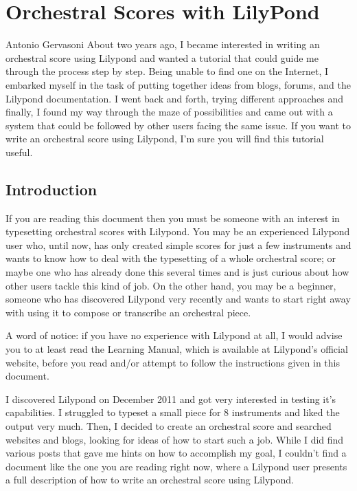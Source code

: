 \documentclass[../../LilyPond-Tutorials]{subfiles}
\begin{document}
\chapter{Orchestral Scores with LilyPond}

\begin{authorAbstract}{Antonio Gervasoni}
About two years ago, I became interested in writing an orchestral score using Lilypond and wanted a tutorial that could guide me through the process step by step. 
Being unable to find one on the Internet, I embarked myself in the task of putting together ideas from blogs, forums, and the Lilypond documentation.
I went back and forth, trying different approaches and finally, I found my way through the maze of possibilities and came out with a system that could be followed by other users facing the same issue.
If you want to write an orchestral score using Lilypond, I'm sure you will find this tutorial useful.
\end{authorAbstract}

\section{Introduction}

If you are reading this document then you must be someone with an interest in typesetting orchestral scores with Lilypond.
You may be an experienced Lilypond user who, until now, has only created simple scores for just a few instruments and wants to know how to deal with the typesetting of a whole orchestral score; or maybe one who has already done this several times and is just curious about how other users tackle this kind of job.
On the other hand, you may be a beginner, someone who has discovered Lilypond very recently and wants to start right away with using it to compose or transcribe an orchestral piece.

A word of notice: if you have no experience with Lilypond at all, I would advise you to at least read the Learning Manual, which is available at Lilypond's official website, before you read and/or attempt to follow the instructions given in this document.

I discovered Lilypond on December 2011 and got very interested in testing it's capabilities.
I struggled to typeset a small piece for 8 instruments and liked the output very much.
Then, I decided to create an orchestral score and searched websites and blogs, looking for ideas of how to start such a job.
While I did find various posts that gave me hints on how to accomplish my goal, I couldn't find a document like the one you are reading right now, where a Lilypond user presents a full description of how to write an orchestral score using Lilypond.
\end{document}
